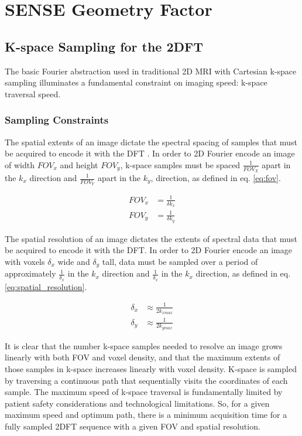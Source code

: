 \section{SENSE Geometry Factor}

\subsection{K-space Sampling for the 2DFT}
The basic Fourier abstraction used in traditional 2D MRI with Cartesian k-space sampling illuminates a fundamental
constraint on imaging speed: k-space traversal speed.

\subsubsection{Sampling Constraints}
The spatial extents of an image dictate the spectral spacing of samples that must be acquired to encode it with the DFT
\cite{nishimura}. In order to 2D Fourier encode an image of width $FOV_x$ and height $FOV_y$, k-space samples must be
spaced $\frac{1}{FOV_X}$ apart in the $k_x$ direction and $\frac{1}{FOV_Y}$ apart in the $k_y$, direction, as defined in
eq. \ref{eq:fov}.

\begin{equation}\label{eq:fov}
    \begin{aligned}
        FOV_x &= \frac{1}{\delta k_x}\\
        FOV_y &= \frac{1}{\delta k_y}
    \end{aligned}
\end{equation}

The spatial resolution of an image dictates the extents of spectral data that must be acquired to encode it with the
DFT. In order to 2D Fourier encode an image with voxels $\delta_x$ wide and $\delta_y$ tall, data must be sampled over a
period of approximately $\frac{1}{\delta_x}$ in the $k_x$ direction and $\frac{1}{\delta_x}$ in the $k_x$ direction, as
defined in eq. \ref{eq:spatial_resolution}.


\begin{equation}\label{eq:spatial_resolution}
    \begin{aligned}
        \delta_x &\approx \frac{1}{2k_{xmax}}\\
        \delta_y &\approx \frac{1}{2k_{ymax}}
    \end{aligned}
\end{equation}

It is clear that the number k-space samples needed to resolve an image grows linearly with both FOV and voxel density,
and that the maximum extents of those samples in k-space increases linearly with voxel density. K-space is sampled by
traversing a continuous path that sequentially visits the coordinates of each sample. The maximum speed of k-space
traversal is fundamentally limited by patient safety considerations and technological limitations. So, for a given
maximum speed and optimum path, there is a minimum acquisition time for a fully sampled 2DFT sequence with a given FOV
and spatial resolution.

